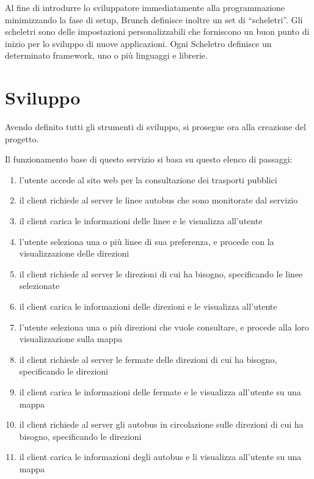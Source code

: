 Al fine di introdurre lo sviluppatore immediatamente alla programmazione minimizzando la fase di setup, Brunch definisce inoltre un set di ``scheletri''. Gli scheletri sono delle impostazioni personalizzabili che forniscono un buon punto di inizio per lo sviluppo di nuove applicazioni. Ogni Scheletro definisce un determinato framework, uno o più linguaggi e librerie.
\newpage

\section{Sviluppo} %
\label{sec:sviluppo}
Avendo definito tutti gli strumenti di sviluppo, si prosegue ora alla creazione del progetto.

Il funzionamento base di questo servizio si basa su questo elenco di passaggi:

\begin{enumerate}
    \item l'utente accede al sito web per la consultazione dei trasporti pubblici
    \item il client richiede al server le linee autobus che sono monitorate dal servizio
    \item il client carica le informazioni delle linee e le visualizza all'utente
    \item l'utente seleziona una o più linee di sua preferenza, e procede con la visualizzazione delle direzioni
    \item il client richiede al server le direzioni di cui ha bisogno, specificando le linee selezionate
    \item il client carica le informazioni delle direzioni e le visualizza all'utente
    \item l'utente seleziona una o più direzioni che vuole consultare, e procede alla loro visualizzazione sulla mappa
    \item il client richiede al server le fermate delle direzioni di cui ha bisogno, specificando le direzioni
    \item il client carica le informazioni delle fermate e le visualizza all'utente su una mappa
    \item il client richiede al server gli autobus in circolazione sulle direzioni di cui ha bisogno, specificando le direzioni
    \item il client carica le informazioni degli autobus e li visualizza all'utente su una mappa
\end{enumerate}
\newpage

